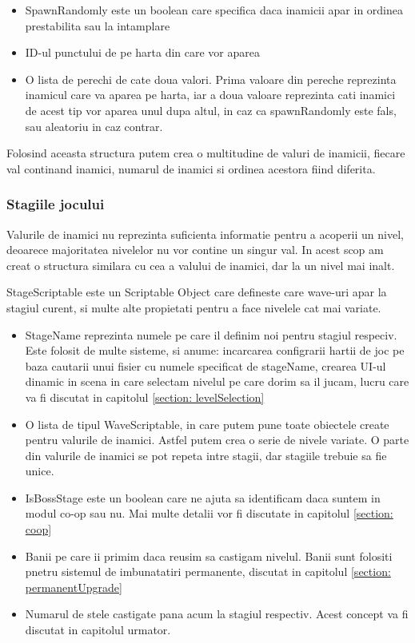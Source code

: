 \documentclass[12pt, a4paper]{article}
\begin{document}
	\begin{itemize}
		\item SpawnRandomly este un boolean care specifica daca inamicii apar in ordinea prestabilita sau la intamplare
		\item ID-ul punctului de pe harta din care vor aparea
		\item O lista de perechi de cate doua valori. Prima valoare din pereche reprezinta inamicul care va aparea pe harta, iar a doua valoare reprezinta cati inamici de acest tip vor aparea unul dupa altul, in caz ca spawnRandomly este fals, sau aleatoriu in caz contrar.
	\end{itemize}

	Folosind aceasta structura putem crea o multitudine de valuri de inamicii, fiecare val continand inamici, numarul de inamici si ordinea acestora fiind diferita.
	
	\subsubsection{Stagiile jocului}
	
	Valurile de inamici nu reprezinta suficienta informatie pentru a acoperii un nivel, deoarece majoritatea nivelelor nu vor contine un singur val. In acest scop am creat o structura similara cu cea a valului de inamici, dar la un nivel mai inalt.
	
	StageScriptable este un Scriptable Object care defineste care wave-uri apar la stagiul curent, si multe alte propietati pentru a face nivelele cat mai variate.
	
	\begin{itemize}
		\item StageName reprezinta numele pe care il definim noi pentru stagiul respeciv. Este folosit de multe sisteme, si anume: incarcarea configrarii hartii de joc pe baza cautarii unui fisier cu numele specificat de stageName, crearea UI-ul dinamic in scena in care selectam nivelul pe care dorim sa il jucam, lucru care va fi discutat in capitolul \ref{section: levelSelection}
		\item O lista de tipul WaveScriptable, in care putem pune toate obiectele create pentru valurile de inamici. Astfel putem crea o serie de nivele variate. O parte din valurile de inamici se pot repeta intre stagii, dar stagiile trebuie sa fie unice.
		\item IsBossStage este un boolean care ne ajuta sa identificam daca suntem in modul co-op sau nu. Mai multe detalii vor fi discutate in capitolul \ref{section: coop} 
		\item Banii pe care ii primim daca reusim sa castigam nivelul. Banii sunt folositi pnetru sistemul de imbunatatiri permanente, discutat in capitolul \ref{section: permanentUpgrade}
		\item Numarul de stele castigate pana acum la stagiul respectiv. Acest concept va fi discutat in capitolul urmator.
	\end{itemize}
	
\end{document}

